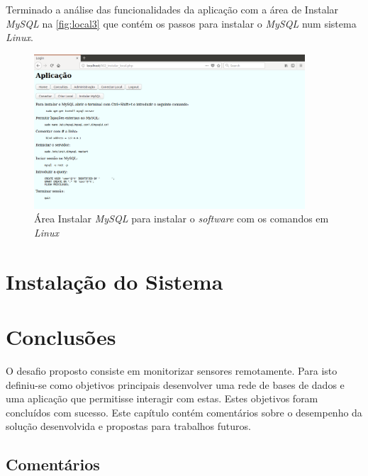 \documentclass[11pt,twoside,a4paper]{report}
\begin{document}
\newpage
Terminado a análise das funcionalidades da aplicação com a área de Instalar \textit{MySQL} na \autoref{fig:local3} que contém os passos para instalar o \textit{MySQL} num sistema \textit{Linux}.
\begin{figure}[H]
	\centering
	\includegraphics[width=0.9\textwidth]{local04} %
	\caption{Área Instalar \textit{MySQL} para instalar o \textit{software} com os comandos em \textit{Linux}}
	\label{fig:local3}
\end{figure}

\cleardoublepage
\chapter{Instalação do Sistema}

\cleardoublepage
\chapter{Conclusões}
O desafio proposto consiste em monitorizar sensores remotamente. Para isto definiu-se como objetivos principais desenvolver uma rede de bases de dados e uma aplicação que permitisse interagir com estas. Estes objetivos foram concluídos com sucesso. Este capítulo contém comentários sobre o desempenho da solução desenvolvida e propostas para trabalhos futuros.

\section{Comentários}
\end{document}
